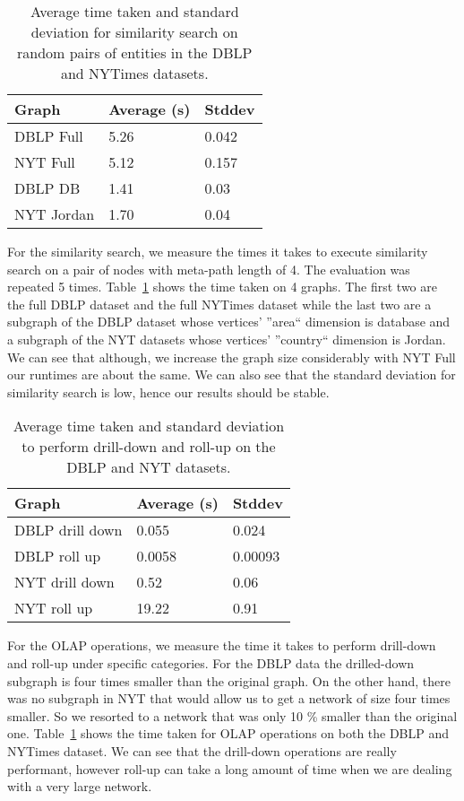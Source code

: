 \begin{table}
    \centering
    \begin{tabular}{| l | l | l |}
        \hline
        Graph & Average (s) & Stddev \\ \hline
        DBLP Full & 5.26 & 0.042 \\ \hline
        NYT Full & 5.12 & 0.157 \\ \hline
        DBLP DB & 1.41 & 0.03 \\ \hline
        NYT Jordan & 1.70 & 0.04 \\
        \hline
    \end{tabular}

    \caption{Average time taken and standard deviation for similarity search on random pairs of entities in the DBLP and NYTimes datasets.}
    \label{tab:similarity-result}
\end{table}

For the similarity search, we measure the times it takes to
execute similarity search on a pair of nodes with meta-path length of 4. The
evaluation was repeated 5 times. Table~\ref{tab:similarity-result} shows
the time taken on 4 graphs. The first two are
the full DBLP dataset and the full NYTimes dataset while
the last two are a subgraph of the DBLP dataset whose
vertices' ''area`` dimension is database and a subgraph of the NYT
datasets whose vertices' ''country`` dimension is Jordan.
We can see that although, we increase the graph size considerably with
NYT Full our runtimes are about the same. We can also see that
the standard deviation for similarity search is low, hence our results
should be stable.

\begin{table}
    \centering
    \begin{tabular}{| l | l | l |}
        \hline
        Graph & Average (s) & Stddev \\ \hline
        DBLP drill down & 0.055 & 0.024 \\ \hline
        DBLP roll up & 0.0058 & 0.00093 \\ \hline
        NYT drill down & 0.52 & 0.06 \\ \hline
        NYT roll up & 19.22 & 0.91 \\
        \hline
    \end{tabular}

    \caption{Average time taken and standard deviation to perform drill-down
    and roll-up on the DBLP and NYT datasets.}
    \label{tab:similarity-time}
\end{table}

For the OLAP operations, we measure the time it takes to
perform drill-down and roll-up under specific categories.
For the DBLP data the drilled-down subgraph is four times smaller
than the original graph. On the other hand, there was no subgraph in NYT 
that would allow us to get a network of size four times smaller. So we resorted to 
a network that was only 10 \% smaller than the original one.
 Table~\ref{tab:similarity-result} shows
the time taken for OLAP operations on both the DBLP and NYTimes dataset.
We can see that the drill-down operations are really performant, however roll-up can
take a long amount of time when we are dealing with a very large network.
